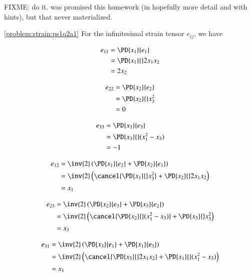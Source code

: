 \begin{Exercise}[
title={Derive the 3D compatibility conditions},
label={problem:strainFIXME:todo3d}
]

FIXME: do it.  was promised this homework (in hopefully more detail and with hints), but that never materialized.
\end{Exercise}

\begin{Answer}[ref={problem:strain:ps1q2a}]

\ref{problem:strain:ps1q2a1} For the infinitesimal strain tensor $e_{ij}$, we have

\begin{align*}
e_{11}
&= \PD{x_1}{e_1} \\
&= \PD{x_1}{}2 x_1 x_2 \\
&= 2 x_2
\end{align*}

\begin{align*}
e_{22}
&= \PD{x_2}{e_2} \\
&= \PD{x_2}{} x_3^2 \\
&= 0
\end{align*}

\begin{align*}
e_{33}
&= \PD{x_3}{e_3} \\
&= \PD{x_3}{} ( x_1^2 - x_3 ) \\
&= -1
\end{align*}

\begin{align*}
e_{12}
&=
\inv{2} \left(
\PD{x_1}{e_2}
+
\PD{x_2}{e_1}
\right) \\
&=
\inv{2}
\left(
\cancel{\PD{x_1}{} x_3^2 }
+
\PD{x_2}{} 2 x_1 x_2
\right) \\
&=
x_1
\end{align*}

\begin{align*}
e_{23}
&=
\inv{2} \left(
\PD{x_2}{e_3}
+
\PD{x_3}{e_2}
\right) \\
&=
\inv{2}
\left(
\cancel{\PD{x_2}{} (x_1^2 - x_3 )}
+
\PD{x_3}{} x_3^2
\right) \\
&=
x_3
\end{align*}

\begin{align*}
e_{31}
&=
\inv{2} \left(
\PD{x_3}{e_1}
+
\PD{x_1}{e_3}
\right) \\
&=
\inv{2}
\left(
\cancel{\PD{x_3}{} 2 x_1 x_2 }
+
\PD{x_1}{} (x_1^2 - x_3 )
\right) \\
&=
x_1
\end{align*}


\end{Answer}
